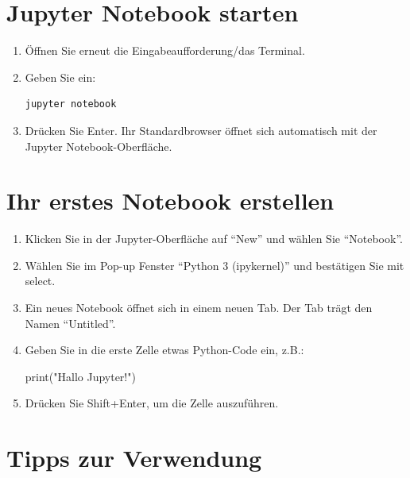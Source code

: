 \documentclass[
  nswissgerman,
  a4paper,
  DIV=11,
  numbers=noendperiod,
  ngerman]{scrreprt}
\newenvironment{Shaded}{\begin{snugshade}}{\end{snugshade}}
\newcommand{\BuiltInTok}[1]{\textcolor[rgb]{0.00,0.23,0.31}{#1}}
\newcommand{\NormalTok}[1]{\textcolor[rgb]{0.00,0.23,0.31}{#1}}
\newcommand{\StringTok}[1]{\textcolor[rgb]{0.13,0.47,0.30}{#1}}
\begin{document}
\section{Jupyter Notebook starten}\label{jupyter-notebook-starten}

\begin{enumerate}
\def\labelenumi{\arabic{enumi}.}
\item
  Öffnen Sie erneut die Eingabeaufforderung/das Terminal.
\item
  Geben Sie ein:

\begin{verbatim}
jupyter notebook
\end{verbatim}
\item
  Drücken Sie Enter. Ihr Standardbrowser öffnet sich automatisch mit der
  Jupyter Notebook-Oberfläche.
\end{enumerate}

\section{Ihr erstes Notebook
erstellen}\label{ihr-erstes-notebook-erstellen}

\begin{enumerate}
\def\labelenumi{\arabic{enumi}.}
\item
  Klicken Sie in der Jupyter-Oberfläche auf ``New'' und wählen Sie
  ``Notebook''.
\item
  Wählen Sie im Pop-up Fenster ``Python 3 (ipykernel)'' und bestätigen
  Sie mit select.
\item
  Ein neues Notebook öffnet sich in einem neuen Tab. Der Tab trägt den
  Namen ``Untitled''.
\item
  Geben Sie in die erste Zelle etwas Python-Code ein, z.B.:

\begin{Shaded}
\begin{Highlighting}[numbers=left,,]
\BuiltInTok{print}\NormalTok{(}\StringTok{"Hallo Jupyter!"}\NormalTok{)}
\end{Highlighting}
\end{Shaded}
\item
  Drücken Sie Shift+Enter, um die Zelle auszuführen.
\end{enumerate}

\section{Tipps zur Verwendung}\label{tipps-zur-verwendung}
\end{document}
